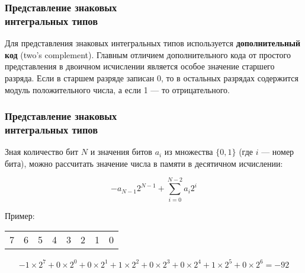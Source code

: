\documentclass[compress, 8pt]{beamer}
\newenvironment{eightbit}{%
    \begin{center}
        \begin{tabular}{ |m{0.2cm}|m{0.2cm}|m{0.2cm}|m{0.2cm}|m{0.2cm}|m{0.2cm}|m{0.2cm}|m{0.2cm}|  }
            \hline
}{
        \hline
        \multicolumn{1}{c}{\color{gray}\tiny{7}} &
        \multicolumn{1}{c}{\color{gray}\tiny{6}} &
        \multicolumn{1}{c}{\color{gray}\tiny{5}} &
        \multicolumn{1}{c}{\color{gray}\tiny{4}} &
        \multicolumn{1}{c}{\color{gray}\tiny{3}} &
        \multicolumn{1}{c}{\color{gray}\tiny{2}} &
        \multicolumn{1}{c}{\color{gray}\tiny{1}} &
        \multicolumn{1}{c}{\color{gray}\tiny{0}} \\
        \end{tabular}
    \end{center}
}
\begin{document}
\begin{frame}[fragile]

    \frametitle{Представление знаковых \\ интегральных типов}

    Для представления знаковых интегральных типов используется
    \textbf{дополнительный код} (two's complement).
    Главным отличием дополнительного кода от простого представления
    в двоичном исчислении является особое значение старшего разряда.
    Если в старшем разряде записан 0, то в остальных разрядах
    содержится модуль положительного числа, а если 1 --- то
    отрицательного.

\end{frame}

\begin{frame}[fragile]

    \frametitle{Представление знаковых \\ интегральных типов}

    Зная количество бит \(N\) и значения битов \(a_i\) из множества
    \(\{0,1\}\) (где \(i\) --- номер бита), можно рассчитать значение
    числа в памяти в десятичном исчислении:

    \begin{displaymath}
        -a_{N-1} 2^{N-1} + \sum_{i=0}^{N-2}{a_i 2^i}
    \end{displaymath}

    Пример:

    \begin{eightbit}
        \cellcolor{yellow!40!white}{1}
        & \cellcolor{green!40!white}{0}
        & \cellcolor{green!40!white}{1}
        & \cellcolor{green!40!white}{0}
        & \cellcolor{green!40!white}{0}
        & \cellcolor{green!40!white}{1}
        & \cellcolor{green!40!white}{0}
        & \cellcolor{green!40!white}{0} \\
    \end{eightbit}

    \begin{displaymath}
        -1 \times 2^7 +
            0 \times 2^0 +
            0 \times 2^1 +
            1 \times 2^2 +
            0 \times 2^3 +
            0 \times 2^4 +
            1 \times 2^5 +
            0 \times 2^6
            = -92
    \end{displaymath}

\end{frame}
\end{document}
